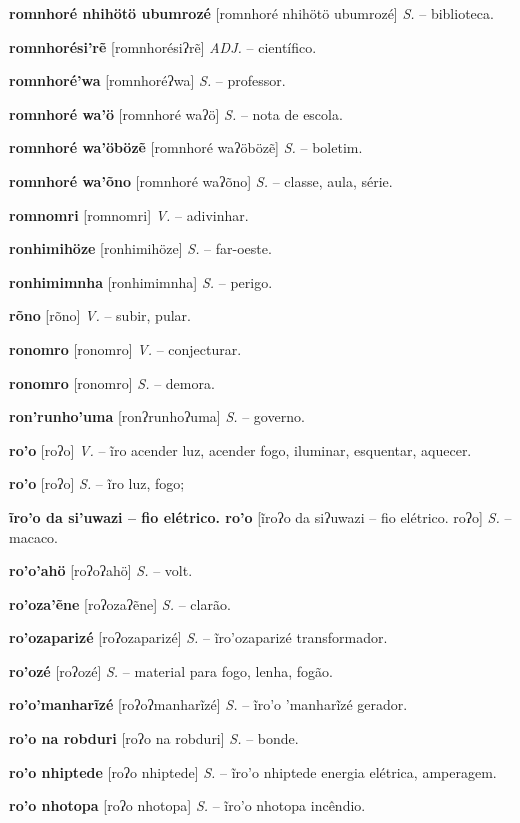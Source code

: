 \textbf{romnhoré nhihötö ubumrozé} [romnhoré nhihötö ubumrozé] \textit{S.} -- biblioteca.

\textbf{romnhorési'rẽ} [romnhorésiʔrẽ] \textit{ADJ.} -- científico.

\textbf{romnhoré'wa} [romnhoréʔwa] \textit{S.} -- professor.

\textbf{romnhoré wa'ö} [romnhoré waʔö] \textit{S.} -- nota de escola.

\textbf{romnhoré wa'öbözẽ} [romnhoré waʔöbözẽ] \textit{S.} -- boletim.

\textbf{romnhoré wa'õno} [romnhoré waʔõno] \textit{S.} -- classe, aula, série.

\textbf{romnomri} [romnomri] \textit{V.} -- adivinhar.

\textbf{ronhimihöze} [ronhimihöze] \textit{S.} -- far-oeste.

\textbf{ronhimimnha} [ronhimimnha] \textit{S.} -- perigo.

\textbf{rõno} [rõno] \textit{V.} -- subir, pular.

\textbf{ronomro} [ronomro] \textit{V.} -- conjecturar.

\textbf{ronomro} [ronomro] \textit{S.} -- demora.

\textbf{ron'runho'uma} [ronʔrunhoʔuma] \textit{S.} -- governo.

\textbf{ro'o} [roʔo] \textit{V.} -- ĩro acender luz, acender fogo, iluminar, esquentar, aquecer.

\textbf{ro'o} [roʔo] \textit{S.} -- ĩro luz, fogo;

\textbf{ĩro'o da si'uwazi -- fio elétrico. ro'o} [ĩroʔo da siʔuwazi -- fio elétrico. roʔo] \textit{S.} -- macaco.

\textbf{ro'o'ahö} [roʔoʔahö] \textit{S.} -- volt.

\textbf{ro'oza'ẽne} [roʔozaʔẽne] \textit{S.} -- clarão.

\textbf{ro'ozaparizé} [roʔozaparizé] \textit{S.} -- ĩro'ozaparizé transformador.

\textbf{ro'ozé} [roʔozé] \textit{S.} -- material para fogo, lenha, fogão.

\textbf{ro'o'manharĩzé} [roʔoʔmanharĩzé] \textit{S.} -- ĩro'o 'manharĩzé gerador.

\textbf{ro'o na robduri} [roʔo na robduri] \textit{S.} -- bonde.

\textbf{ro'o nhiptede} [roʔo nhiptede] \textit{S.} -- ĩro'o nhiptede energia elétrica, amperagem.

\textbf{ro'o nhotopa} [roʔo nhotopa] \textit{S.} -- ĩro'o nhotopa incêndio.

